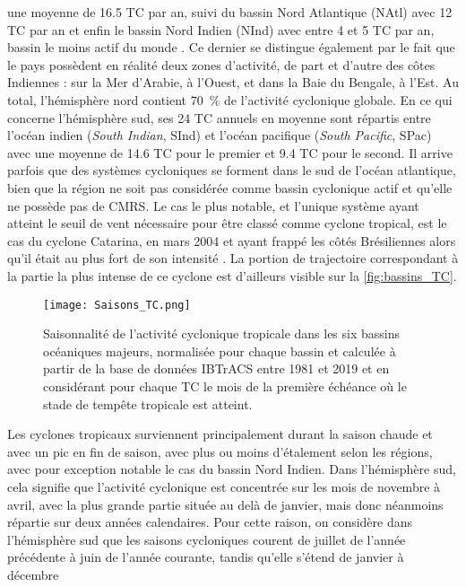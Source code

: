 \documentclass[../main.tex]{subfiles}
\begin{document}
une moyenne de \num{16.5} TC par an, suivi du bassin Nord Atlantique (NAtl) avec \num{12} TC par an et enfin le bassin Nord Indien (NInd) avec entre \num{4} et
\num{5} TC par an, bassin le moins actif du monde \parencite{gray_global_1968,lander_look_1998,schreck_impact_2014}. Ce dernier se distingue également par le
fait que le pays possèdent en réalité deux zones d'activité, de part et d'autre des côtes Indiennes : sur la Mer d'Arabie, à l'Ouest, et dans la Baie du
Bengale, à l'Est. Au total, l'hémisphère nord contient \SI{70}{\percent} de l'activité cyclonique globale. En ce qui concerne l'hémisphère sud, ses \num{24} TC
annuels en moyenne sont répartis entre l'océan indien (\textit{South Indian}, SInd) et l'océan pacifique (\textit{South Pacific}, SPac) avec une moyenne de
\num{14.6} TC pour le premier et \num{9.4} TC pour le second. Il arrive parfois que des systèmes cycloniques se forment dans le sud de l'océan atlantique, bien
que la région ne soit pas considérée comme bassin cyclonique actif et qu'elle ne possède pas de CMRS. Le cas le plus notable, et l'unique système ayant atteint
le seuil de vent nécessaire pour être classé comme cyclone tropical, est le cas du cyclone Catarina, en mars 2004 et ayant frappé les côtés Brésiliennes alors
qu'il était au plus fort de son intensité \parencite{mctaggart-cowan_analysis_2006}. La portion de trajectoire correspondant à la partie la plus intense de ce
cyclone est d'ailleurs visible sur la \cref{fig:bassins_TC}.
%
\begin{figure}[t]
    \centering
    \texttt{[image: Saisons\_TC.png]}
    \caption{Saisonnalité de l'activité cyclonique tropicale dans les six bassins océaniques majeurs, normalisée pour chaque bassin et calculée à partir de la
    base de données IBTrACS entre 1981 et 2019 et en considérant pour chaque TC le mois de la première échéance où le stade de tempête tropicale est atteint.}
    \label{fig:saisons_TC}
\end{figure}
%
Les cyclones tropicaux surviennent principalement durant la saison chaude et avec un pic en fin de saison, avec plus ou moins d'étalement selon les régions,
avec pour exception notable le cas du bassin Nord Indien. Dans l'hémisphère sud, cela signifie que l'activité cyclonique est concentrée sur les mois de novembre
à avril, avec la plus grande partie située au delà de janvier, mais donc néanmoins répartie sur deux années calendaires. Pour cette raison, on considère dans
l'hémisphère sud que les saisons cycloniques courent de juillet de l'année précédente à juin de l'année courante, tandis qu'elle s'étend de janvier à décembre
\end{document}
